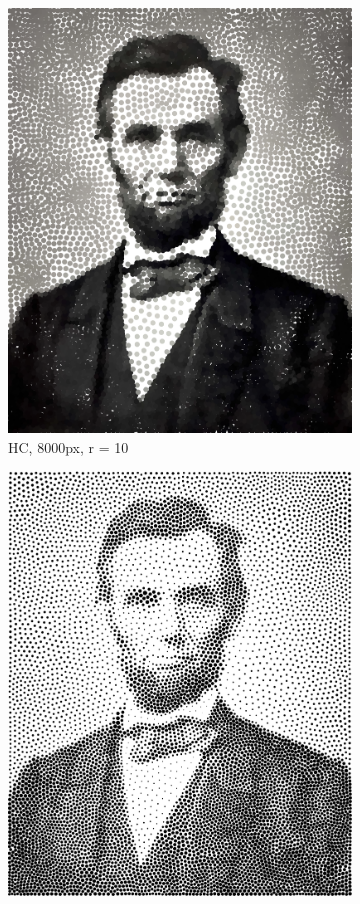 \documentclass[11pt]{article}
\begin{document}
\begin{figure}[H]
\begin{subfigure}[b]{0.4\linewidth}
		\includegraphics[width=\linewidth]{pix/hc_AL_8000_fixed_10.png}
		\caption{HC, 8000px, r = 10}
	\end{subfigure}
	\begin{subfigure}[b]{0.4\linewidth}
		\includegraphics[width=\linewidth]{pix/vr_AL_8000_r10.png}

\end{subfigure}
\end{figure}
\end{document}
